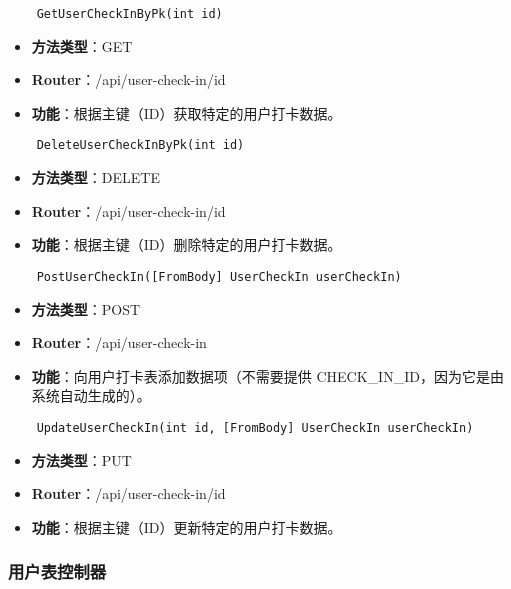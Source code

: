 \begin{verbatim}
	GetUserCheckInByPk(int id)
\end{verbatim}

\begin{itemize}
	\item \textbf{方法类型}：GET
	\item \textbf{Router}：/api/user-check-in/{id}
	\item \textbf{功能}：根据主键（ID）获取特定的用户打卡数据。
\end{itemize}

\begin{verbatim}
	DeleteUserCheckInByPk(int id)
\end{verbatim}

\begin{itemize}
	\item \textbf{方法类型}：DELETE
	\item \textbf{Router}：/api/user-check-in/{id}
	\item \textbf{功能}：根据主键（ID）删除特定的用户打卡数据。
\end{itemize}

\begin{verbatim}
	PostUserCheckIn([FromBody] UserCheckIn userCheckIn)
\end{verbatim}

\begin{itemize}
	\item \textbf{方法类型}：POST
	\item \textbf{Router}：/api/user-check-in
	\item \textbf{功能}：向用户打卡表添加数据项（不需要提供 CHECK\_IN\_ID，因为它是由系统自动生成的）。
\end{itemize}

\begin{verbatim}
	UpdateUserCheckIn(int id, [FromBody] UserCheckIn userCheckIn)
\end{verbatim}

\begin{itemize}
	\item \textbf{方法类型}：PUT
	\item \textbf{Router}：/api/user-check-in/{id}
	\item \textbf{功能}：根据主键（ID）更新特定的用户打卡数据。
\end{itemize}

\subsubsection{用户表控制器}

